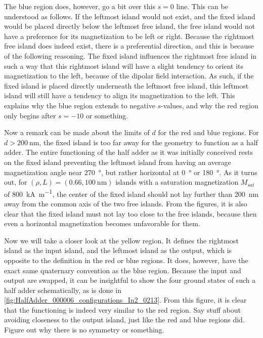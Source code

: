 \documentclass[11pt,a4paper,english]{article}
\begin{document}
The blue region does, however, go a bit over this $s=0$ line. This can be understood as follows. If the leftmost island would not exist, and the fixed island would be placed directly below the leftmost free island, the free island would not have a preference for its magnetization to be left or right. Because the rightmost free island does indeed exist, there is a preferential direction, and this is because of the following reasoning. The fixed island influences the rightmost free island in such a way that this rightmost island will have a slight tendency to orient its magnetization to the left, because of the dipolar field interaction. As such, if the fixed island is placed directly underneath the leftmost free island, this leftmost island will still have a tendency to align its magnetization to the left. This explains why the blue region extends to negative $s$-values, and why the red region only begins after $s=-10$ or something. 

Now a remark can be made about the limits of $d$ for the red and blue regions. For $d>\SI{200}{\nano\metre}$, the fixed island is too far away for the geometry to function as a half adder. The entire functioning of the half adder as it was initially conceived rests on the fixed island preventing the leftmost island from having an average magnetization angle near \SI{270}{\degree}, but rather horizontal at \SI{0}{\degree} or \SI{180}{\degree}. As it turns out, for $(\rho, L) = (0.66,\SI{100}{\nano\metre})$ islands with a saturation magnetization $M_{sat}$ of \SI{800}{\kilo\ampere\per\metre}, the center of the fixed island should not lay further than \SI{200}{\nano\metre} away from the common axis of the two free islands. From the figures, it is also clear that the fixed island must not lay too close to the free islands, because then even a horizontal magnetization becomes unfavorable for them.

Now we will take a closer look at the yellow region. It defines the rightmost island as the input island, and the leftmost island as the output, which is opposite to the definition in the red or blue regions. It does, however, have the exact same quaternary convention as the blue region. Because the input and output are swapped, it can be insightful to show the four ground states of such a half adder schematically, as is done in \cref{fig:HalfAdder_000006_configurations_In2_0213}. From this figure, it is clear that the functioning is indeed very similar to the red region. Say stuff about avoiding closeness to the output island, just like the red and blue regions did. Figure out why there is no symmetry or something.
\end{document}
